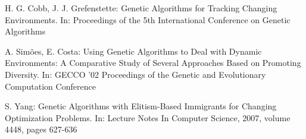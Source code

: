 \documentclass[a4paper,12pt]{article}
\begin{document}
\footnotesize
\begin{thebibliography}{4}
H. G. Cobb, J. J. Grefenstette: Genetic Algorithms for Tracking Changing Environments. In: Proceedings of the 5th International Conference on Genetic Algorithms

A. Simões, E. Costa: Using Genetic Algorithms to Deal with Dynamic Environments: A Comparative Study of Several Approaches Based on Promoting Diversity. In:  GECCO '02 Proceedings of the Genetic and Evolutionary Computation Conference

S. Yang: Genetic Algorithms with Elitism-Based Immigrants for Changing Optimization Problems. In: Lecture Notes In Computer Science, 2007, volume 4448, pages 627-636
\end{thebibliography}
\end{document}
